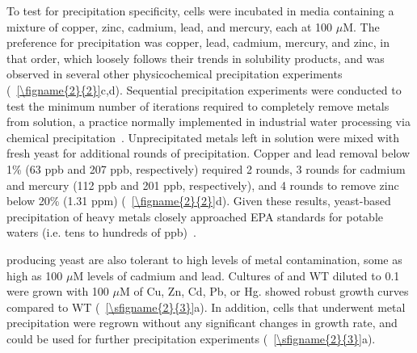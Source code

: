 \documentclass[../main/main]{subfiles}
\begin{document}
To test for precipitation specificity, cells were incubated in media containing a mixture of copper, zinc, cadmium, lead, and mercury, each at 100 $\mu$M. The preference for precipitation was copper, lead, cadmium, mercury, and zinc, in that order, which loosely follows their trends in solubility products, and was observed in several other physicochemical precipitation experiments~\cite{fu2011removal,neculita2007,rickard2006} (\FIGURE~\ref{\figname{2}{2}}c,d). Sequential precipitation experiments were conducted to test the minimum number of iterations required to completely remove metals from solution,
a practice normally implemented in industrial water processing via chemical precipitation~\cite{kurniawan2006,kumargupta2012,bolong2009,johnson2005}. Unprecipitated metals left in solution were mixed with fresh yeast for additional rounds of precipitation. Copper and lead removal below 1\% (63 ppb and 207 ppb, respectively) required 2 rounds, 3 rounds for cadmium and mercury (112 ppb and 201 ppb, respectively), and 4 rounds to remove zinc below 20\% (1.31 ppm) (\FIGURE~\ref{\figname{2}{2}}d). Given these results, yeast-based precipitation of heavy metals closely approached EPA standards for potable waters (i.e. tens to hundreds of ppb)~\cite{usepaa,usepa}.

\HS{} producing yeast are also tolerant to high levels of metal contamination, some as high as 100 $\mu$M levels of cadmium and lead. Cultures of  and WT diluted to 0.1 \OD{} were grown with 100 $\mu$M of Cu, Zn, Cd, Pb, or Hg.  showed robust growth curves compared to WT (\sFIGURE~\ref{\sfigname{2}{3}}a). In addition, cells that underwent metal precipitation were regrown without any significant changes in growth rate, and could be used for further precipitation experiments (\sFIGURE~\ref{\sfigname{2}{3}}a).
\clearpage %

\end{document}
